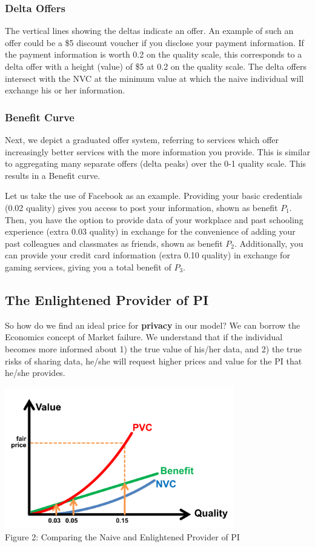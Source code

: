 \documentclass{icmmcm}
\begin{document}
\subsubsection*{Delta Offers} 
The vertical lines showing the deltas indicate an offer. An example of such an offer could be a \$5 discount voucher if you disclose your payment information. If the payment information is worth 0.2 on the quality scale, this corresponds to a delta offer with a height (value) of \$5 at 0.2 on the quality scale. The delta offers intersect with the NVC at the minimum value at which the naive individual will exchange his or her information.

\subsubsection*{Benefit Curve} Next, we depict a graduated offer system, referring to services which offer increasingly better services with the more information you provide. 
This is similar to aggregating many separate offers (delta peaks) over the 0-1 quality scale. This results in a Benefit curve.

Let us take the use of Facebook as an example. Providing your basic credentials (0.02 quality) gives you access to post your information, shown as benefit $P_1$. Then, you have the option to provide data of your workplace and past schooling experience (extra 0.03 quality) in exchange for the convenience of adding your past colleagues and classmates as friends, shown as benefit $P_2$. Additionally, you can provide your credit card information (extra 0.10 quality) in exchange for gaming services, giving you a total benefit of $P_3$. 

\subsection{The Enlightened Provider of PI}
So how do we find an ideal price for \textbf{privacy} in our model? 
We can borrow the Economics concept of Market failure. We understand that if the individual becomes more informed about 1) the true value of his/her data, and 2) the true risks of sharing data, he/she will request higher prices and value for the PI that he/she provides.

\includegraphics[width=0.75\textwidth, center]{Picture2.png} 
\\ \caption{Figure 2: Comparing the Naive and Enlightened Provider of PI}
\end{document}
